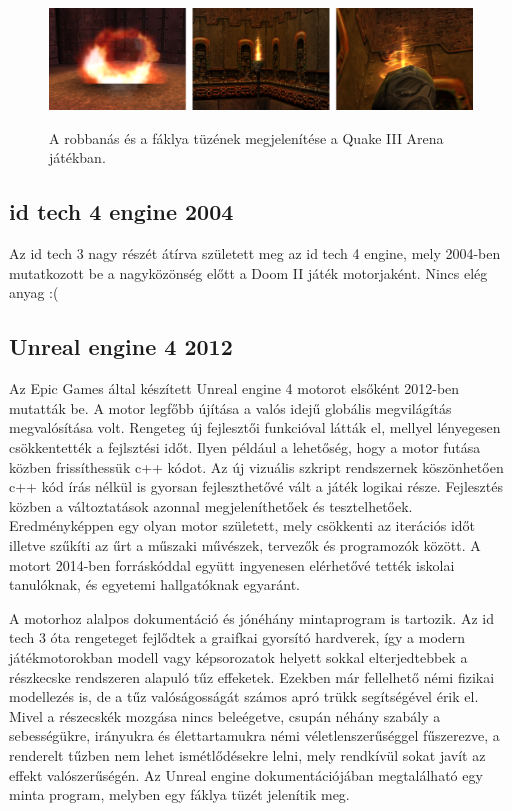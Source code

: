 \begin{figure}[h]
 \caption{A robbanás és a fáklya tüzének megjelenítése a Quake III Arena játékban.}
 \includegraphics[width=\textwidth]{kepek/quake3fire.png}
 \label{fig:quake3fire}
\end{figure}


\subsection{ id tech 4 engine 2004}
Az id tech 3 nagy részét átírva született meg az id tech 4 engine, mely 2004-ben mutatkozott be a nagyközönség előtt a Doom II játék motorjaként.
Nincs elég anyag :(

\subsection{Unreal engine 4 2012}
Az Epic Games által készített Unreal engine 4 motorot elsőként 2012-ben mutatták be. A motor legfőbb újítása a valós idejű globális megvilágítás megvalósítása volt. Rengeteg új fejlesztői funkcióval látták el, mellyel lényegesen csökkentették a fejlsztési időt. Ilyen például a lehetőség, hogy a motor futása közben frissíthessük c++ kódot. Az új vizuális szkript rendszernek köszönhetően c++ kód írás nélkül is gyorsan fejleszthetővé vált a játék logikai része. Fejlesztés közben a változtatások azonnal megjeleníthetőek és tesztelhetőek. Eredményképpen egy olyan motor született, mely csökkenti az iterációs időt illetve szűkíti az űrt a műszaki művészek, tervezők és programozók között. A motort 2014-ben forráskóddal együtt ingyenesen elérhetővé tették iskolai tanulóknak, és egyetemi hallgatóknak egyaránt. \cite{wikUE4}

A motorhoz alalpos dokumentáció és jónéhány mintaprogram is tartozik. Az id tech 3 óta rengeteget fejlődtek a graifkai gyorsító hardverek, így a modern játékmotorokban modell vagy képsorozatok helyett sokkal elterjedtebbek a részkecske rendszeren alapuló tűz effeketek. Ezekben már fellelhető némi fizikai modellezés is, de a tűz valóságosságát számos apró trükk segítségével érik el. Mivel a részecskék mozgása nincs beleégetve, csupán néhány szabály a sebességükre, irányukra és élettartamukra némi véletlenszerűséggel fűszerezve, a renderelt tűzben nem lehet ismétlődésekre lelni, mely rendkívül sokat javít az effekt valószerűségén. Az Unreal engine dokumentációjában megtalálható egy minta program, melyben egy fáklya tüzét jelenítik meg.

